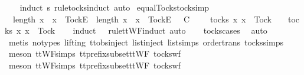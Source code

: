 %
\isadelimproof
\ \ %
\endisadelimproof
%
\isatagproof
{}\isamarkupfalse%
\ {\isacharparenleft}induct\ s\ rule{\isacharcolon}tocks{\isachardot}induct{\isacharcomma}\ auto{\isacharparenright}%
\endisatagproof
{\isafoldproof}%
%
\isadelimproof
\isanewline
%
\endisadelimproof
\isanewline
{}\isamarkupfalse%
\ equal{\isacharunderscore}Tocks{\isacharunderscore}tocks{\isacharunderscore}imp{\isacharcolon}\isanewline
\ \ {\isachardoublequoteopen}length\ {\isacharbrackleft}x{\isasymleftarrow}{\isasymrho}\ {\isachardot}\ x\ {\isacharequal}\ {\isacharbrackleft}Tock{\isacharbrackright}\isactrlsub E{\isacharbrackright}\ {\isacharequal}\ length\ {\isacharbrackleft}x{\isasymleftarrow}{\isasymsigma}\ {\isachardot}\ x\ {\isacharequal}\ {\isacharbrackleft}Tock{\isacharbrackright}\isactrlsub E{\isacharbrackright}\ {\isasymLongrightarrow}\ {\isasymrho}\ {\isasymlesssim}\isactrlsub C\ {\isasymsigma}\ {\isasymLongrightarrow}\ {\isasymsigma}\ {\isasymin}\ tocks\ {\isacharbraceleft}x{\isachardot}\ x\ {\isasymnoteq}\ Tock{\isacharbraceright}\ {\isasymLongrightarrow}\ {\isasymrho}\ {\isasymin}\ tocks\ {\isacharbraceleft}x{\isachardot}\ x\ {\isasymnoteq}\ Tock{\isacharbraceright}{\isachardoublequoteclose}\isanewline
%
\isadelimproof
\ \ %
\endisadelimproof
%
\isatagproof
{}\isamarkupfalse%
\ {\isacharparenleft}induct\ {\isasymrho}\ {\isasymsigma}\ rule{\isacharcolon}ttWF{}{\isachardot}induct{\isacharcomma}\ auto{\isacharparenright}\isanewline
\ \ \isamarkupfalse%
\ tocks{\isachardot}cases\ \isamarkupfalse%
\ auto\isanewline
\ \ \isamarkupfalse%
\ {\isacharparenleft}metis\ {\isacharparenleft}no{\isacharunderscore}types{\isacharcomma}\ lifting{\isacharparenright}\ ttobs{\isachardot}inject{\isacharparenleft}{}{\isacharparenright}\ list{\isachardot}inject\ list{\isachardot}simps{\isacharparenleft}{}{\isacharparenright}\ order{\isachardot}trans\ tocks{\isachardot}simps{\isacharparenright}\isanewline
\ \ \isamarkupfalse%
\ {\isacharparenleft}meson\ ttWF{\isachardot}simps{\isacharparenleft}{}{}{\isacharparenright}\ tt{\isacharunderscore}prefix{\isacharunderscore}subset{\isacharunderscore}ttWF\ tocks{\isacharunderscore}wf{\isacharparenright}\isanewline
\ \ \isamarkupfalse%
\ {\isacharparenleft}meson\ ttWF{\isachardot}simps{\isacharparenleft}{}{}{\isacharparenright}\ tt{\isacharunderscore}prefix{\isacharunderscore}subset{\isacharunderscore}ttWF\ tocks{\isacharunderscore}wf{\isacharparenright}\isanewline
